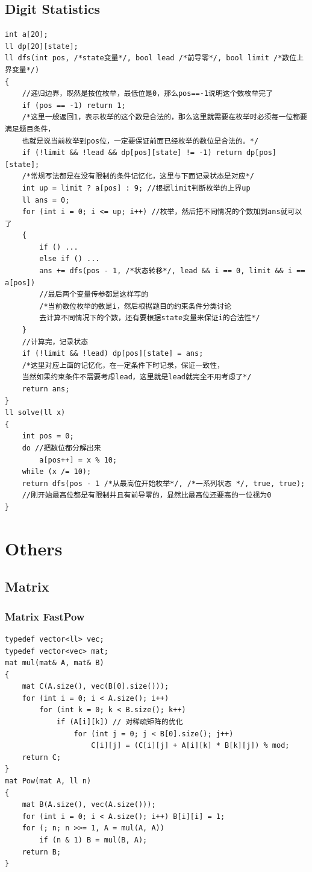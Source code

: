 \documentclass[twoside]{article}
\begin{document}
\subsection{Digit Statistics}
\begin{lstlisting}
int a[20];
ll dp[20][state];
ll dfs(int pos, /*state变量*/, bool lead /*前导零*/, bool limit /*数位上界变量*/)
{
    //递归边界，既然是按位枚举，最低位是0，那么pos==-1说明这个数枚举完了
    if (pos == -1) return 1;
    /*这里一般返回1，表示枚举的这个数是合法的，那么这里就需要在枚举时必须每一位都要满足题目条件，
    也就是说当前枚举到pos位，一定要保证前面已经枚举的数位是合法的。*/
    if (!limit && !lead && dp[pos][state] != -1) return dp[pos][state];
    /*常规写法都是在没有限制的条件记忆化，这里与下面记录状态是对应*/
    int up = limit ? a[pos] : 9; //根据limit判断枚举的上界up
    ll ans = 0;
    for (int i = 0; i <= up; i++) //枚举，然后把不同情况的个数加到ans就可以了
    {
        if () ...
        else if () ...
        ans += dfs(pos - 1, /*状态转移*/, lead && i == 0, limit && i == a[pos])
        //最后两个变量传参都是这样写的
        /*当前数位枚举的数是i，然后根据题目的约束条件分类讨论
        去计算不同情况下的个数，还有要根据state变量来保证i的合法性*/
    }
    //计算完，记录状态
    if (!limit && !lead) dp[pos][state] = ans;
    /*这里对应上面的记忆化，在一定条件下时记录，保证一致性，
    当然如果约束条件不需要考虑lead，这里就是lead就完全不用考虑了*/
    return ans;
}
ll solve(ll x)
{
    int pos = 0;
    do //把数位都分解出来
        a[pos++] = x % 10;
    while (x /= 10);
    return dfs(pos - 1 /*从最高位开始枚举*/, /*一系列状态 */, true, true);
    //刚开始最高位都是有限制并且有前导零的，显然比最高位还要高的一位视为0
}
\end{lstlisting}
\clearpage\section{Others}
\subsection{Matrix}
\subsubsection{Matrix FastPow}
\begin{lstlisting}
typedef vector<ll> vec;
typedef vector<vec> mat;
mat mul(mat& A, mat& B)
{
    mat C(A.size(), vec(B[0].size()));
    for (int i = 0; i < A.size(); i++)
        for (int k = 0; k < B.size(); k++)
            if (A[i][k]) // 对稀疏矩阵的优化
                for (int j = 0; j < B[0].size(); j++)
                    C[i][j] = (C[i][j] + A[i][k] * B[k][j]) % mod;
    return C;
}
mat Pow(mat A, ll n)
{
    mat B(A.size(), vec(A.size()));
    for (int i = 0; i < A.size(); i++) B[i][i] = 1;
    for (; n; n >>= 1, A = mul(A, A))
        if (n & 1) B = mul(B, A);
    return B;
}
\end{lstlisting}
\end{document}
